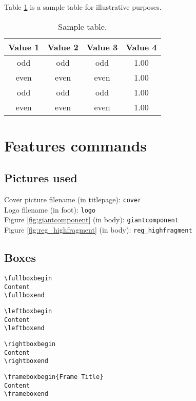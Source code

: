 \documentclass[12pt]{article}
\begin{document}
\lipsum[1]

Table \ref{tab:sample_table} is a sample table for illustrative purposes. 

\begin{table}[!h]
\centering
\caption{Sample table.}
\begin{tabular}{cccc}
\toprule
Value 1 & Value 2 & Value 3 & Value 4\\
\midrule
 odd     & odd   & odd & 1.00 \\
 even    & even  & even& 1.00 \\
 odd     & odd   & odd & 1.00 \\
 even    & even  & even& 1.00 \\
\bottomrule
\end{tabular}
\label{tab:sample_table}
\end{table}

\lipsum[1]

\lipsum[1]
\frameboxend

\newpage

\section{Features commands}

\subsection{Pictures used}

\noindent
Cover picture filename (in titlepage): \texttt{cover}\\
Logo filename (in foot): \texttt{logo}\\
Figure \ref{fig:giantcomponent} (in body): \texttt{giantcomponent} \\
Figure \ref{fig:reg_highfragment} (in body): \texttt{reg\_highfragment}


\subsection{Boxes}

\begin{verbatim}
\fullboxbegin
Content
\fullboxend
\end{verbatim}

\begin{verbatim}
\leftboxbegin
Content
\leftboxend
\end{verbatim}

\begin{verbatim}
\rightboxbegin
Content
\rightboxend
\end{verbatim}

\begin{verbatim}
\frameboxbegin{Frame Title}
Content
\frameboxend
\end{verbatim}
\end{document}
